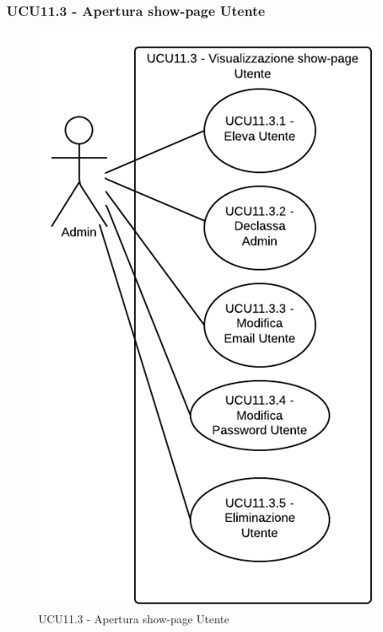 \subsubsection{UCU11.3 - Apertura show-page Utente}    
    \begin{figure}[H]
      \begin{center}
      \includegraphics[scale=0.16]{UML/UCU11.3 - Apertura show-page Utente.png}
      \caption{UCU11.3 - Apertura show-page Utente}
      \end{center} 
    \end{figure}    
    
